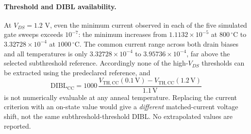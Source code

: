 \begin{table}[H]\centering\small
\caption{Part 3 values extracted from completed Sentaurus sweeps.
N/A denotes a current criterion outside the measured gate-voltage range,
not a missing or failed simulation.}
\end{table}

\paragraph{Threshold and DIBL availability.}
At $V_{DS}=1.2$ V, even the minimum current observed in each of
the five simulated gate sweeps exceeds $10^{-7}$: the minimum
increases from $1.1132\times10^{-5}$ at $800\,^\circ$C to
$3.32728\times10^{-4}$ at $1000\,^\circ$C.
The common current range across both drain biases and all
temperatures is only
$3.32728\times10^{-4}$ to $3.95736\times10^{-4}$,
far above the selected subthreshold reference.
Accordingly none of the high-$V_{DS}$ thresholds can be extracted
using the predeclared reference, and
\[
\mathrm{DIBL}_{\mathrm{CC}}=
1000\,\frac{V_{\mathrm{TH,CC}}(0.1\mathrm{\,V})-
V_{\mathrm{TH,CC}}(1.2\mathrm{\,V})}{1.1\mathrm{\,V}}
\]
is not numerically evaluable at any anneal temperature.
Replacing the current criterion with an on-state value would
give a \emph{different} matched-current voltage shift, not the same
subthreshold-threshold DIBL. No extrapolated values are reported.


